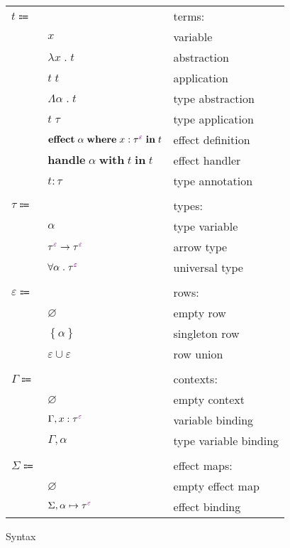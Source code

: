 \documentclass[12pt]{article}
\newcommand\anno[2]{#1 : #2}
\newcommand\term{t}
\newcommand\eVar{x}
\newcommand\eAbs[2]{\lambda #1 \; . \; #2}
\newcommand\eApp[2]{#1 \; #2}
\newcommand\eTAbs[2]{\Lambda #1 \; . \; #2}
\newcommand\eTApp[2]{#1 \; #2}
\newcommand\eHandle[3]{\textbf{handle} \; #1 \; \textbf{with} \; #2 \; \textbf{in} \; #3}
\newcommand\eEffect[5]{\textbf{effect} \; #1 \; \textbf{where} \; \anno{#2}{\tEmbellished{#3}{#4}} \; \textbf{in} \; #5}
\newcommand\eAnno[2]{\anno{#1}{#2}}
\newcommand\type{\tau}
\newcommand\tVar{\alpha}
\newcommand\tArrow[4]{\tEmbellished{#1}{#2} \rightarrow \tEmbellished{#3}{#4}}
\newcommand\tForall[3]{\forall #1 \; . \; \tEmbellished{#2}{#3}}
\newcommand\tEmbellished[2]{{#1}^{\textcolor{violet}{#2}}}
\newcommand\row{\varepsilon}
\newcommand\rEmpty{\varnothing}
\newcommand\rSingleton[1]{\left\{ #1 \right\}}
\newcommand\rUnion[2]{#1 \cup #2}
\newcommand\context{\Gamma}
\newcommand\cEmpty{\varnothing}
\newcommand\cTExtend[4]{#1, \anno{#2}{\tEmbellished{#3}{#4}}}
\newcommand\cKExtend[2]{#1, #2}
\newcommand\effectMap{\Sigma}
\newcommand\emEmpty{\varnothing}
\newcommand\emExtend[4]{#1, #2 \mapsto \tEmbellished{#3}{#4}}
\begin{document}
      \begin{figure}[H]
        \begin{mdframed}[backgroundcolor=none]
          \begin{center}
            \begin{tabular}{l l l}
              $\term \Coloneqq$ & & terms: \\
              & $\eVar$ & variable \\
              & $\eAbs{\eVar}{\term}$ & abstraction \\
              & $\eApp{\term}{\term}$ & application \\
              & $\eTAbs{\tVar}{\term}$ & type abstraction \\
              & $\eTApp{\term}{\type}$ & type application \\
              & $\eEffect{\tVar}{\eVar}{\type}{\row}{\term}$ & effect definition \\
              & $\eHandle{\tVar}{\term}{\term}$ & effect handler \\
              & $\eAnno{\term}{\type}$ & type annotation \\
              \\
              $\type \Coloneqq$ & & types: \\
              & $\tVar$ & type variable \\
              & $\tArrow{\type}{\row}{\type}{\row}$ & arrow type \\
              & $\tForall{\tVar}{\type}{\row}$ & universal type \\
              \\
              $\row \Coloneqq$ & & rows: \\
              & $\rEmpty$ & empty row \\
              & $\rSingleton{\tVar}$ & singleton row \\
              & $\rUnion{\row}{\row}$ & row union \\
              \\
              $\context \Coloneqq$ & & contexts: \\
              & $\cEmpty$ & empty context \\
              & $\cTExtend{\context}{\eVar}{\type}{\row}$ & variable binding \\
              & $\cKExtend{\context}{\tVar}$ & type variable binding \\
              \\
              $\effectMap \Coloneqq$ & & effect maps: \\
              & $\emEmpty$ & empty effect map \\
              & $\emExtend{\effectMap}{\tVar}{\type}{\row}$ & effect binding \\
            \end{tabular}
          \end{center}

          \caption{Syntax}\label{fig:syntax}
        \end{mdframed}
      \end{figure}
\end{document}
